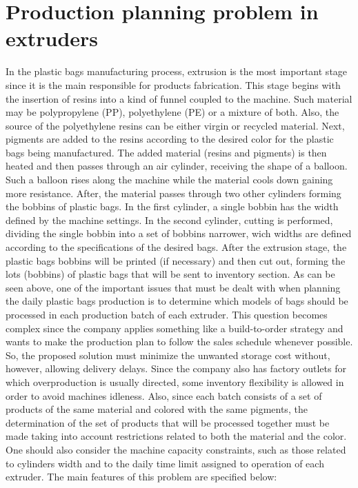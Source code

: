 \section{Production planning problem in extruders}
\label{sec:1}

In the plastic bags manufacturing process, extrusion is the most important stage since it is the main responsible for products fabrication. This stage begins with the insertion of resins into a kind of funnel coupled to the machine. Such material may be polypropylene (PP), polyethylene (PE) or a mixture of both. Also, the source of the polyethylene resins can be either virgin or recycled material. Next, pigments are added to the resins according to the desired color for the plastic bags being manufactured. The added material (resins and pigments) is then heated and then passes through an air cylinder, receiving the shape of a balloon. Such a balloon rises along the machine while the material cools down gaining more resistance. After, the material passes through two other cylinders forming the bobbins of plastic bags. In the first cylinder, a single bobbin has the width defined by the machine
settings. In the second cylinder, cutting is performed, dividing the single bobbin into a set of bobbins narrower, wich widths are defined according to the specifications of the desired bags. After the extrusion stage, the plastic bags bobbins will be printed (if necessary) and then cut out, forming the lots (bobbins) of plastic bags that will be sent to inventory section. As can be seen above, one of the important issues that must be dealt with when planning the daily plastic bags production is to determine which models of bags should be processed in each production batch of each extruder. This question becomes complex since the company applies something like a build-to-order strategy and wants to make the production plan to follow the sales schedule whenever possible. So, the proposed solution must minimize the unwanted storage cost without, however, allowing delivery delays. Since the company also has factory outlets for which overproduction is usually directed, some inventory flexibility is allowed in order to avoid machines idleness. Also, since each batch consists of a set of products of the same material and colored with the same pigments, the determination of the set of products that will be processed together must be made taking into account restrictions related to both the material and the color. One should also consider the machine capacity constraints, such as those related to cylinders width and to the daily time limit assigned to operation of each extruder. The main features of this problem are specified below:


